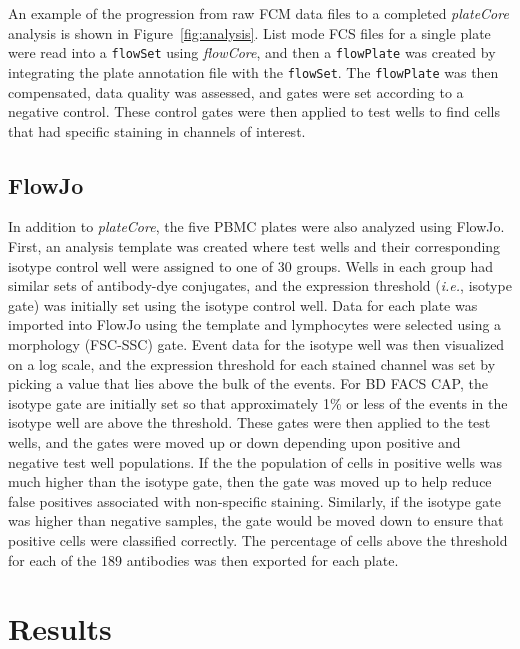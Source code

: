 \documentclass[12pt]{article}
\newcommand{\Robject}[1]{{\texttt{#1}}}
\newcommand{\Rpackage}[1]{{\textit{#1}}}
\begin{document}
An example of the progression from raw FCM data files to a completed
\Rpackage{plateCore} analysis is shown in Figure~\ref{fig:analysis}. List mode
FCS files for a single plate were read into a \Robject{flowSet} using
\Rpackage{flowCore}, and then a \Robject{flowPlate} was created by integrating
the plate annotation file with the \Robject{flowSet}. The \Robject{flowPlate}
was then compensated, data quality was assessed, and gates were set according
to a negative control. These control gates were then applied to test wells to
find cells that had specific staining in channels of interest.

\subsection*{FlowJo}

In addition to \Rpackage{plateCore}, the five PBMC plates were also analyzed
using FlowJo. First, an analysis template was created where test wells and
their corresponding isotype control well were assigned to one of 30 groups.
Wells in each group had similar sets of antibody-dye conjugates, and
the expression threshold (\emph{i.e.}, isotype gate) was initially set using
the isotype control well. Data for each plate was imported into FlowJo using
the template and lymphocytes were selected using a morphology (FSC-SSC) gate.
Event data for the isotype well was then visualized on a log scale, and the
expression threshold for each stained channel was set by picking a value that
lies above the bulk of the events. For BD FACS CAP, the isotype gate are
initially set so that approximately 1\% or less of the events in the isotype
well are above the threshold. These gates were then applied to the test wells,
and the gates were moved up or down depending upon positive and negative test
well populations. If the the population of cells in positive wells was much
higher than the isotype gate, then the gate was moved up to help reduce false
positives associated with non-specific staining.  Similarly, if the isotype
gate was higher than negative samples, the gate would be moved down to ensure
that positive cells were classified correctly. The percentage of cells above
the threshold for each of the 189 antibodies was then exported for each plate.

\section*{Results}
\end{document}
